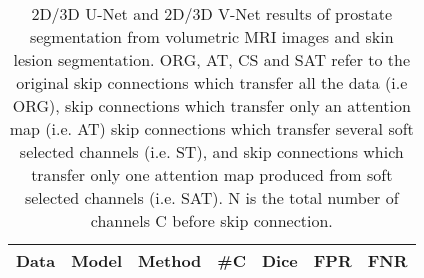 \documentclass{article}
\begin{document}
\begin{table}
\small
\setlength{\tabcolsep}{5pt}
\centering
\caption{2D/3D U-Net and 2D/3D V-Net results of prostate segmentation from volumetric MRI images and skin lesion segmentation. ORG, AT, CS and SAT refer to the original skip connections which transfer all the data (i.e ORG), skip connections which transfer only an attention map (i.e. AT) skip connections which transfer several soft selected channels (i.e. ST), and skip connections which transfer only one attention map produced from soft selected channels (i.e. SAT). N is the total number of channels C before skip connection.}
\label{table1}
\begin{tabular}{lcllccc}
\hline
Data & \multicolumn{1}{l}{Model} & Method & \#C & Dice & FPR & FNR \\ \hline


\end{tabular}
\end{table}
\end{document}
